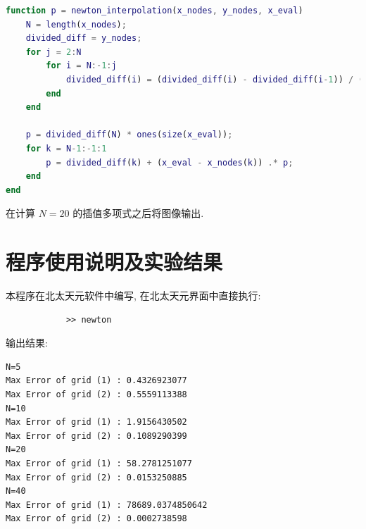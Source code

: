 \documentclass[12pt]{article}
\begin{document}
		\begin{lstlisting}[language=Matlab]
function p = newton_interpolation(x_nodes, y_nodes, x_eval)
	N = length(x_nodes);
	divided_diff = y_nodes;
	for j = 2:N
		for i = N:-1:j
			divided_diff(i) = (divided_diff(i) - divided_diff(i-1)) / (x_nodes(i) - x_nodes(i-j+1));
		end
	end
	
	p = divided_diff(N) * ones(size(x_eval));
	for k = N-1:-1:1
		p = divided_diff(k) + (x_eval - x_nodes(k)) .* p;
	end
end
		\end{lstlisting}

		在计算 $N = 20$ 的插值多项式之后将图像输出.

	\section{程序使用说明及实验结果}
		本程序在北太天元软件中编写, 在北太天元界面中直接执行:
		\begin{verbatim}
			>> newton
		\end{verbatim}

		输出结果:
		\begin{verbatim}
N=5
Max Error of grid (1) : 0.4326923077
Max Error of grid (2) : 0.5559113388
N=10
Max Error of grid (1) : 1.9156430502
Max Error of grid (2) : 0.1089290399
N=20
Max Error of grid (1) : 58.2781251077
Max Error of grid (2) : 0.0153250885
N=40
Max Error of grid (1) : 78689.0374850642
Max Error of grid (2) : 0.0002738598
		\end{verbatim}
\end{document}
